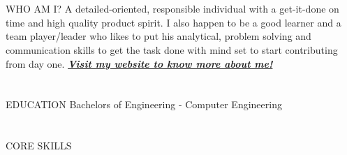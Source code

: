 \documentclass{my_cv}
\begin{document}
\vspace{2pt}


\begin{minipage}[t]{0.47\textwidth} %
	\vspace{0.5cm}
	\vspace{-\baselineskip} %

\section{\faGraduationCap}{WHO AM I?}
{A detailed-oriented, responsible individual with a get-it-done on time and high quality product spirit. I also happen to be a good learner and a team player/leader who likes to put his analytical, problem solving and communication skills to get the task done with mind set to start contributing from day one. \textbf{\emph{\href{https://yash-1o1.github.io/}{Visit my website to know more about me!}}}}

\vspace{0.4cm}

\section{\faGraduationCap}{EDUCATION}
{}{Bachelors of Engineering - Computer Engineering}{}
\end{minipage}
\hfill %
\begin{minipage}[t]{0.47\textwidth} %
	\vspace{.1cm}
	\section{\faGraduationCap}{CORE SKILLS}
	\begin{barchart}{5.5}
	\end{barchart}
\end{minipage} 
\end{document}
